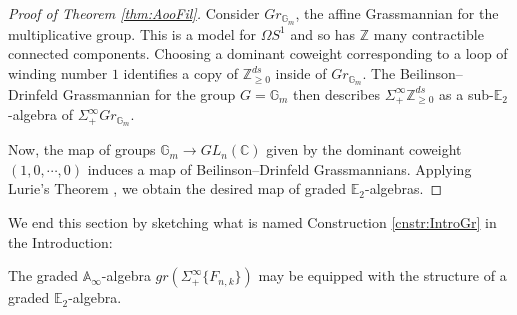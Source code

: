 \begin{proof}[Proof of Theorem \ref{thm:AooFil}]
Consider $Gr_{\mathbb{G}_m}$, the affine Grassmannian for the multiplicative group.  This is a model for $\Omega S^1$ and so has $\mathbb{Z}$ many contractible connected components.  Choosing a dominant coweight corresponding to a loop of winding number $1$ identifies a copy of $\mathbb{Z}^{ds}_{\ge 0}$ inside of $Gr_{\mathbb{G}_m}$.  The Beilinson--Drinfeld Grassmannian for the group $G=\mathbb{G}_m$ then describes $\Sigma^{\infty}_+ \mathbb{Z}^{ds}_{\ge 0}$ as a sub-$\mathbb{E}_2$-algebra of $\Sigma^{\infty}_+ Gr_{\mathbb{G}_m}$.

Now, the map of groups $\mathbb{G}_m \rightarrow GL_n(\mathbb{C})$ given by the dominant coweight $(1,0,\cdots,0)$ induces a map of Beilinson--Drinfeld Grassmannians.  Applying Lurie's Theorem \cite[Theorem 5.5.4.10]{HA}, we obtain the desired map of graded $\mathbb{E}_2$-algebras.
\end{proof}

We end this section by sketching what is named Construction \ref{cnstr:IntroGr} in the Introduction:

\begin{cnstr} \label{cnstr:E2GrConstruction}
The graded $\mathbb{A}_\infty$-algebra $gr(\Sigma^{\infty}_+ \{F_{n,k}\})$ may be equipped with the structure of a graded $\mathbb{E}_2$-algebra.
\end{cnstr}

